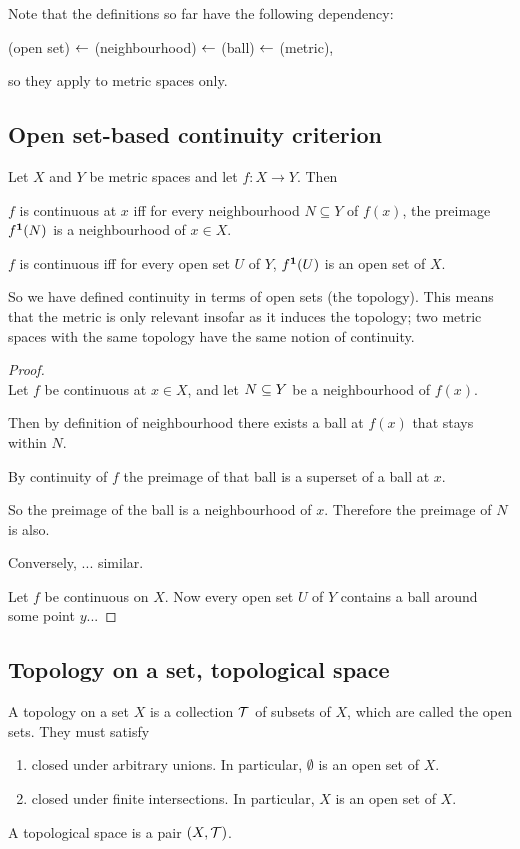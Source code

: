 \begin{remark*}
  Note that the definitions so far have the following dependency:

  (open set) $\leftarrow$ (neighbourhood) $\leftarrow$ (ball) $\leftarrow$ (metric),

  so they apply to metric spaces only.
\end{remark*}

\subsection{Open set-based continuity criterion}
\begin{theorem}
  Let $X$ and $Y$ be metric spaces and let $f:X \to Y$. Then

  $f$ is continuous at $x$ iff for every neighbourhood $N \subseteq Y$ of $f(x)$, the preimage
  $f^{\mathbf 1}(N)$ is a neighbourhood of $x \in X$.

  $f$ is continuous iff for every open set $U$ of $Y$, $f^{\mathbf 1}(U)$ is an open set of $X$.
\end{theorem}

\begin{remark*}
  So we have defined continuity in terms of open sets (the topology). This means that the metric is
  only relevant insofar as it induces the topology; two metric spaces with the same topology have
  the same notion of continuity.
\end{remark*}

\begin{proof}~\\
  Let $f$ be continuous at $x \in X$, and let $N \subseteq Y$ be a neighbourhood of $f(x)$.

  Then by definition of neighbourhood there exists a ball at $f(x)$ that stays within $N$.

  By continuity of $f$ the preimage of that ball is a superset of a ball at $x$.

  So the preimage of the ball is a neighbourhood of $x$. Therefore the preimage of $N$ is also.

  Conversely, ... similar.

  Let $f$ be continuous on $X$. Now every open set $U$ of $Y$ contains a ball around some point $y$...
\end{proof}

\subsection{Topology on a set, topological space}
\begin{definition}
  A topology on a set $X$ is a collection $\mathcal T$ of subsets of $X$, which are called the open
  sets. They must satisfy
  \begin{enumerate}
  \item closed under arbitrary unions. In particular, $\emptyset$ is an open set of $X$.
  \item closed under finite intersections. In particular, $X$ is an open set of $X$.
  \end{enumerate}
  A topological space is a pair $(X, \mathcal T)$.
\end{definition}

